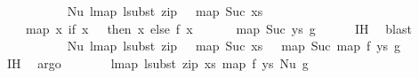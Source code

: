 \begin{isabellebody}
\ {\isachardoublequoteopen}{\isachardot}{\kern0pt}{\isachardot}{\kern0pt}{\isachardot}{\kern0pt}\ {\isacharequal}{\kern0pt}\isanewline
\ \ \ \ \ \ \ \ Nu\ {\isacharparenleft}{\kern0pt}{\isacharparenleft}{\kern0pt}lmap\ {\isacharparenleft}{\kern0pt}lsubst\ {\isacharparenleft}{\kern0pt}zip\ {\isacharparenleft}{\kern0pt}{}\ {\isacharhash}{\kern0pt}\ map\ Suc\ xs{\isacharparenright}{\kern0pt}\isanewline
\ \ \ \ {\isacharparenleft}{\kern0pt}map\ {\isacharparenleft}{\kern0pt}{\isasymlambda}x{\isachardot}{\kern0pt}\ if\ x\ {\isacharequal}{\kern0pt}\ {}\ then\ x\ else\ {\isacharparenleft}{\kern0pt}f\ {\isacharparenleft}{\kern0pt}x\ {\isacharminus}{\kern0pt}\ {}{\isacharparenright}{\kern0pt}\ {\isacharplus}{\kern0pt}\ {}{\isacharparenright}{\kern0pt}{\isacharparenright}{\kern0pt}\ {\isacharparenleft}{\kern0pt}{}\ {\isacharhash}{\kern0pt}\ map\ Suc\ ys{\isacharparenright}{\kern0pt}{\isacharparenright}{\kern0pt}{\isacharparenright}{\kern0pt}{\isacharparenright}{\kern0pt}\ g{\isacharparenright}{\kern0pt}{\isacharparenright}{\kern0pt}{\isachardoublequoteclose}\isanewline
\ \ \ \ \isamarkupfalse%
\ IH\ \isamarkupfalse%
\ blast\isanewline
\ \ \isamarkupfalse%
\ \isamarkupfalse%
\ {\isachardoublequoteopen}{\isachardot}{\kern0pt}{\isachardot}{\kern0pt}{\isachardot}{\kern0pt}\ {\isacharequal}{\kern0pt}\isanewline
\ \ \ \ \ \ \ \ Nu\ {\isacharparenleft}{\kern0pt}{\isacharparenleft}{\kern0pt}lmap\ {\isacharparenleft}{\kern0pt}lsubst\ {\isacharparenleft}{\kern0pt}zip\ {\isacharparenleft}{\kern0pt}{}\ {\isacharhash}{\kern0pt}\ map\ Suc\ xs{\isacharparenright}{\kern0pt}\ {\isacharparenleft}{\kern0pt}{}\ {\isacharhash}{\kern0pt}\ map\ Suc\ {\isacharparenleft}{\kern0pt}map\ f\ ys{\isacharparenright}{\kern0pt}{\isacharparenright}{\kern0pt}{\isacharparenright}{\kern0pt}{\isacharparenright}{\kern0pt}\ g{\isacharparenright}{\kern0pt}{\isacharparenright}{\kern0pt}{\isachardoublequoteclose}\isanewline
\ \ \ \ \isamarkupfalse%
\ IH{}\ \isamarkupfalse%
\ argo\isanewline
\ \ \isamarkupfalse%
\ \isamarkupfalse%
\ {\isachardoublequoteopen}{\isachardot}{\kern0pt}{\isachardot}{\kern0pt}{\isachardot}{\kern0pt}\ {\isacharequal}{\kern0pt}\ lmap\ {\isacharparenleft}{\kern0pt}lsubst\ {\isacharparenleft}{\kern0pt}zip\ xs\ {\isacharparenleft}{\kern0pt}map\ f\ ys{\isacharparenright}{\kern0pt}{\isacharparenright}{\kern0pt}{\isacharparenright}{\kern0pt}\ {\isacharparenleft}{\kern0pt}Nu\ g{\isacharparenright}{\kern0pt}{\isachardoublequoteclose}\isanewline

\end{isabellebody}
